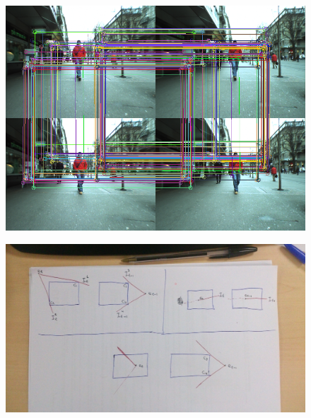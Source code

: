 \begin{figure}[h!]
\centering
\includegraphics{fundamentalMatrixComputation}
\label{fig:cp04_polar_fund_matrix_computation}
\end{figure}

\begin{figure}[p]
\centering
\includegraphics[width=\textwidth]{polar_common_region}
\label{fig:cp04_polar_common_region}
\end{figure}

